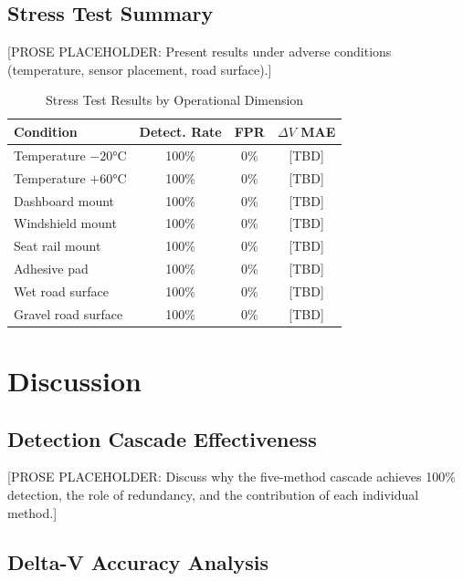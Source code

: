 \documentclass[conference,twocolumn]{IEEEtran}
\begin{document}
\subsection{Stress Test Summary}

[PROSE PLACEHOLDER: Present results under adverse conditions (temperature, sensor placement, road surface).]

\begin{table}[t]
\centering
\caption{Stress Test Results by Operational Dimension}
\label{tab:stress-test}
\small
\renewcommand{\arraystretch}{1.15}
\begin{tabular}{@{}l c c c@{}}
\toprule
\textbf{Condition} & \textbf{Detect. Rate} & \textbf{FPR} & \textbf{$\Delta V$ MAE} \\
\midrule
Temperature $-20$\si{\celsius} & 100\% & 0\% & [TBD] \\
Temperature $+60$\si{\celsius} & 100\% & 0\% & [TBD] \\
Dashboard mount & 100\% & 0\% & [TBD] \\
Windshield mount & 100\% & 0\% & [TBD] \\
Seat rail mount & 100\% & 0\% & [TBD] \\
Adhesive pad & 100\% & 0\% & [TBD] \\
Wet road surface & 100\% & 0\% & [TBD] \\
Gravel road surface & 100\% & 0\% & [TBD] \\
\bottomrule
\end{tabular}
\end{table}

\section{Discussion}

\subsection{Detection Cascade Effectiveness}

[PROSE PLACEHOLDER: Discuss why the five-method cascade achieves 100\% detection, the role of redundancy, and the contribution of each individual method.]

\subsection{Delta-V Accuracy Analysis}
\end{document}
